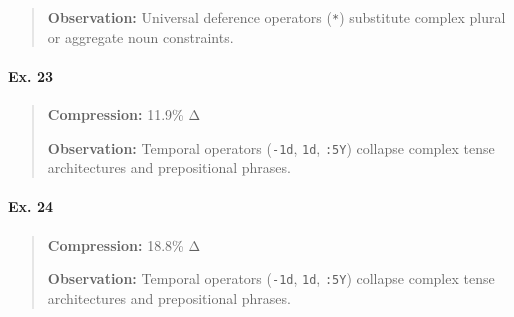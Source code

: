 \begin{Shaded}
\begin{Shaded}
\begin{Shaded}
\begin{Shaded}
\begin{Shaded}
\begin{Shaded}
\begin{Shaded}
\begin{Shaded}
\begin{Shaded}
\begin{quote}
\textbf{Observation:} Universal deference operators (\texttt{*})
substitute complex plural or aggregate noun constraints.
\end{quote}

\paragraph{Ex. 23}\label{ex.-23}

\begin{Shaded}
\begin{Highlighting}[]
\end{Highlighting}
\end{Shaded}

\begin{quote}
\textbf{Compression:} 11.9\% Δ

\textbf{Observation:} Temporal operators (\texttt{-1d}, \texttt{1d},
\texttt{:5Y}) collapse complex tense architectures and prepositional
phrases.
\end{quote}

\paragraph{Ex. 24}\label{ex.-24}

\begin{Shaded}
\begin{Highlighting}[]
\end{Highlighting}
\end{Shaded}

\begin{quote}
\textbf{Compression:} 18.8\% Δ

\textbf{Observation:} Temporal operators (\texttt{-1d}, \texttt{1d},
\texttt{:5Y}) collapse complex tense architectures and prepositional
phrases.
\end{quote}


\end{Shaded}
\end{Shaded}
\end{Shaded}
\end{Shaded}
\end{Shaded}
\end{Shaded}
\end{Shaded}
\end{Shaded}
\end{Shaded}
